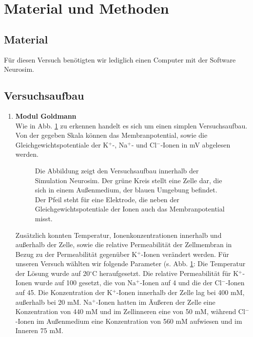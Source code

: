 \documentclass[11pt]{article}
\begin{document}
\section{Material und Methoden}
\subsection{Material}
Für diesen Versuch benötigten wir lediglich einen Computer mit der Software Neurosim. 

\subsection{Versuchsaufbau}
\begin{enumerate}
\item \textbf{Modul Goldmann} \\
Wie in Abb. \ref{goldmann-aufbau} zu erkennen handelt es sich um einen simplen Versuchsaufbau. Von der gegeben Skala können das Membranpotential, sowie die Gleichgewichtspotentiale der K$^+$-, Na$^+$- und Cl$^-$-Ionen in mV abgelesen werden. 
\begin{figure}[H]
\caption{Die Abbildung zeigt den Versuchsaufbau innerhalb der Simulation Neurosim. Der grüne Kreis stellt eine Zelle dar, die sich in einem Außenmedium, der blauen Umgebung befindet. Der Pfeil steht für eine Elektrode, die neben der Gleichgewichtspotentiale der Ionen auch das Membranpotential misst.}
\label{goldmann-aufbau}
\end{figure}

Zusätzlich konnten Temperatur, Ionenkonzentrationen innerhalb und außerhalb der Zelle, sowie die relative Permeabilität der Zellmembran in Bezug zu der Permeabilität gegenüber K$^+$-Ionen  verändert werden. Für unseren Versuch wählten wir folgende Parameter (s. Abb. \ref{goldmann-aufbau}: Die Temperatur der Lösung wurde auf 20$^\circ$C heraufgesetzt. Die relative Permeabilität für K$^+$-Ionen wurde auf 100 gesetzt, die von Na$^+$-Ionen auf 4 und die der Cl$^-$-Ionen auf 45. Die Konzentration der K$^+$-Ionen innerhalb der Zelle lag bei 400 mM, außerhalb bei 20 mM. Na$^+$-Ionen hatten im Äußeren der Zelle eine Konzentration von 440 mM und im Zellinneren eine von 50 mM, während Cl$^-$-Ionen im Außenmedium eine Konzentration von 560 mM aufwiesen und im Inneren 75 mM.\\


\end{enumerate}
\end{document}
